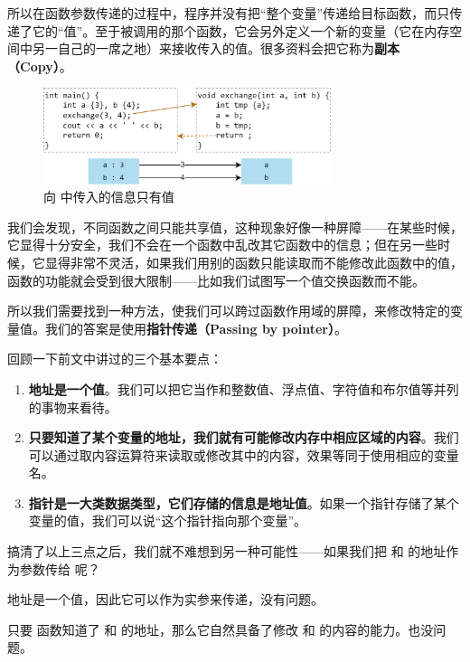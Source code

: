 所以在函数参数传递的过程中，程序并没有把``整个变量''传递给目标函数，而只传递了它的``值''。至于被调用的那个函数，它会另外定义一个新的变量（它在内存空间中另一自己的一席之地）来接收传入的值。很多资料会把它称为\textbf{副本（Copy）}。\par
\begin{figure}[htbp]
    \centering
    \includegraphics[width=0.75\textwidth]{../images/generalized_parts/05_process_of_pass_by_reference_300.png}
    \caption{\lstinline@main@ 向 \lstinline@exchange@ 中传入的信息只有值}
\end{figure}
我们会发现，不同函数之间只能共享值，这种现象好像一种屏障——在某些时候，它显得十分安全，我们不会在一个函数中乱改其它函数中的信息；但在另一些时候，它显得非常不灵活，如果我们用别的函数只能读取而不能修改此函数中的值，函数的功能就会受到很大限制——比如我们试图写一个值交换函数而不能。\par
所以我们需要找到一种方法，使我们可以跨过函数作用域的屏障，来修改特定的变量值。我们的答案是使用\textbf{指针传递（Passing by pointer）}。\par
回顾一下前文中讲过的三个基本要点：
\begin{enumerate}
    \item \textbf{地址是一个值}。我们可以把它当作和整数值、浮点值、字符值和布尔值等并列的事物来看待。
    \item \textbf{只要知道了某个变量的地址，我们就有可能修改内存中相应区域的内容}。我们可以通过取内容运算符来读取或修改其中的内容，效果等同于使用相应的变量名。
    \item \textbf{指针是一大类数据类型，它们存储的信息是地址值}。如果一个指针存储了某个变量的值，我们可以说``这个指针指向那个变量''。
\end{enumerate}\par
搞清了以上三点之后，我们就不难想到另一种可能性——如果我们把 \lstinline@a@ 和 \lstinline@b@ 的地址作为参数传给 \lstinline@exchange@ 呢？\par
地址是一个值，因此它可以作为实参来传递，没有问题。\par
只要 \lstinline@exchange@ 函数知道了 \lstinline@a@ 和 \lstinline@b@ 的地址，那么它自然具备了修改 \lstinline@a@ 和 \lstinline@b@ 的内容的能力。也没问题。\par

